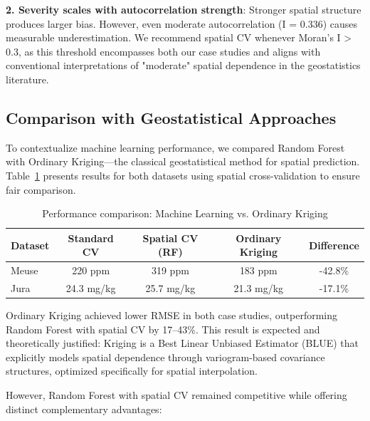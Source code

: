\documentclass[a4paper,fleqn]{cas-sc}
\begin{document}
\textbf{2. Severity scales with autocorrelation strength}: Stronger spatial structure produces larger bias. However, even moderate autocorrelation (I = 0.336) causes measurable underestimation. We recommend spatial CV whenever Moran's I > 0.3, as this threshold encompasses both our case studies and aligns with conventional interpretations of "moderate" spatial dependence in the geostatistics literature.

\subsection{Comparison with Geostatistical Approaches}

To contextualize machine learning performance, we compared Random Forest with Ordinary Kriging---the classical geostatistical method for spatial prediction. Table~\ref{tab:kriging-comparison} presents results for both datasets using spatial cross-validation to ensure fair comparison.

\begin{table}
\centering
\caption{Performance comparison: Machine Learning vs. Ordinary Kriging}
\label{tab:kriging-comparison}
\begin{tabular}{lcccc}
\toprule
Dataset & Standard CV & Spatial CV (RF) & Ordinary Kriging & Difference \\
\midrule
Meuse & 220 ppm & 319 ppm & 183 ppm & -42.8\% \\
Jura & 24.3 mg/kg & 25.7 mg/kg & 21.3 mg/kg & -17.1\% \\
\bottomrule
\end{tabular}
\end{table}

Ordinary Kriging achieved lower RMSE in both case studies, outperforming Random Forest with spatial CV by 17--43\%. This result is expected and theoretically justified: Kriging is a Best Linear Unbiased Estimator (BLUE) that explicitly models spatial dependence through variogram-based covariance structures, optimized specifically for spatial interpolation.

However, Random Forest with spatial CV remained competitive while offering distinct complementary advantages:
\end{document}
